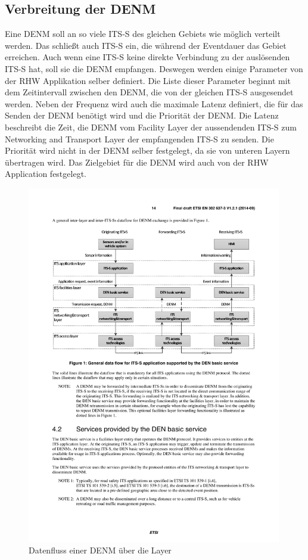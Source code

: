 \subsection{Verbreitung der DENM}
Eine \ac{DENM} soll an so viele \ac{ITS-S} des gleichen Gebiets wie möglich verteilt werden. Das schließt auch \ac{ITS-S} ein, die während der Eventdauer das Gebiet erreichen. Auch wenn eine \ac{ITS-S} keine direkte Verbindung zu der auslösenden \ac{ITS-S} hat, soll sie die \ac{DENM} empfangen. Deswegen werden einige Parameter von der \ac{RHW} Applikation selber definiert. Die Liste dieser Parameter beginnt mit dem Zeitintervall zwischen den \ac{DENM}, die von der gleichen \ac{ITS-S} ausgesendet werden. Neben der Frequenz wird auch die maximale Latenz definiert, die für das Senden der \ac{DENM} benötigt wird und die Priorität der \ac{DENM}. Die Latenz beschreibt die Zeit, die \ac{DENM} vom Facility Layer der aussendenden \ac{ITS-S} zum Networking and Transport Layer der empfangenden \ac{ITS-S} zu senden. Die Priorität wird nicht in der \ac{DENM} selber festgelegt, da sie von unteren Layern übertragen wird. Das Zielgebiet für die \ac{DENM} wird auch von der \ac{RHW} Application festgelegt.


\begin{figure}[htbp]
	\includegraphics[width=0.99\textwidth]{content/images/04_facilitylayer/denVersendenLayerUeberblick.pdf}
	\caption{Datenfluss einer DENM über die Layer \cite{en302637-3}}
	\label{fig:darstellungDenVerteilenLayer}
\end{figure}

